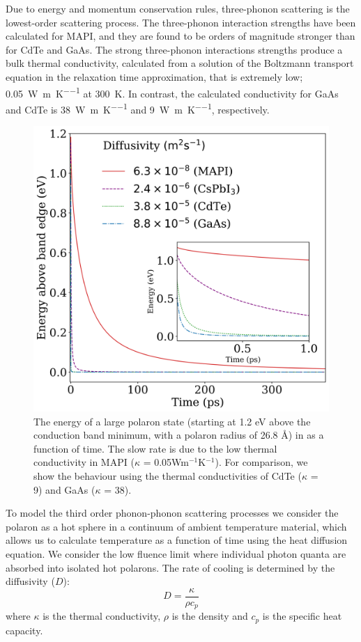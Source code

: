 Due to energy and momentum conservation rules, three-phonon scattering is the lowest-order scattering process.  The three-phonon interaction strengths have been calculated for MAPI, \cite{} and they are found to be orders of magnitude stronger than for CdTe and GaAs. The strong three-phonon interactions strengths produce a bulk thermal conductivity, calculated from a solution of the Boltzmann transport equation in the relaxation time approximation, that is extremely low; \SI{0.05}{\watt\per\metre\per\K} at \SI{300}{\K}.\cite{Whalley2016} 
In contrast, the calculated conductivity for GaAs and CdTe is 
\SI{38}{\watt\per\metre\per\K}
and
\SI{9}{\watt\per\metre\per\K},
respectively.

\begin{figure}[h]
\centering
  \includegraphics[width=1.0\textwidth]{figures/ch5/f4.png}
  \caption[Hot carrier cooling rate]{The energy of a large polaron state (starting at 1.2 eV above the conduction band minimum, with a polaron radius of 26.8 \AA) 
  in  as a function of time.
  The slow rate is due to the low thermal conductivity in MAPI ($\kappa$ = 0.05Wm$^{-1}$K$^{-1}$). 
  For comparison, we show the behaviour using the thermal conductivities of 
  CdTe ($\kappa$ = 9) and GaAs ($\kappa$ = 38). }
  \label{ch5TemperatureTime}
\end{figure}

To model the third order phonon-phonon scattering processes we consider the polaron as a hot sphere in a continuum of ambient temperature material, which allows us to calculate temperature as a function of time using the heat diffusion equation.
We consider the low fluence limit where individual photon quanta are absorbed into isolated hot polarons.
The rate of cooling is determined by the diffusivity ($D$): 
\begin{equation}
    D= \frac{\kappa}{\rho c_p}
\end{equation} 
where $\kappa$ is the thermal conductivity, $\rho$ is the density and $c_p$ is the specific heat capacity. 

